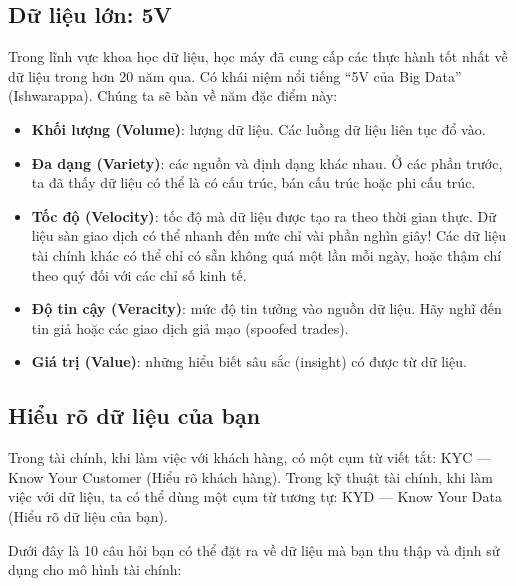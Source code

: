 \subsection{Dữ liệu lớn: 5V}

Trong lĩnh vực khoa học dữ liệu, học máy đã cung cấp các thực hành tốt nhất về dữ liệu trong hơn 20 năm qua. Có khái niệm nổi tiếng ``5V của Big Data'' (Ishwarappa). Chúng ta sẽ bàn về năm đặc điểm này:

\begin{itemize}
  \item \textbf{Khối lượng (Volume)}: lượng dữ liệu. Các luồng dữ liệu liên tục đổ vào.
  \item \textbf{Đa dạng (Variety)}: các nguồn và định dạng khác nhau. Ở các phần trước, ta đã thấy dữ liệu có thể là có cấu trúc, bán cấu trúc hoặc phi cấu trúc.
  \item \textbf{Tốc độ (Velocity)}: tốc độ mà dữ liệu được tạo ra theo thời gian thực. Dữ liệu sàn giao dịch có thể nhanh đến mức chỉ vài phần nghìn giây! Các dữ liệu tài chính khác có thể chỉ có sẵn không quá một lần mỗi ngày, hoặc thậm chí theo quý đối với các chỉ số kinh tế.
  \item \textbf{Độ tin cậy (Veracity)}: mức độ tin tưởng vào nguồn dữ liệu. Hãy nghĩ đến tin giả hoặc các giao dịch giả mạo (spoofed trades).
  \item \textbf{Giá trị (Value)}: những hiểu biết sâu sắc (insight) có được từ dữ liệu.
\end{itemize}

\subsection{Hiểu rõ dữ liệu của bạn}

Trong tài chính, khi làm việc với khách hàng, có một cụm từ viết tắt: KYC — Know Your Customer (Hiểu rõ khách hàng). Trong kỹ thuật tài chính, khi làm việc với dữ liệu, ta có thể dùng một cụm từ tương tự: KYD — Know Your Data (Hiểu rõ dữ liệu của bạn).

Dưới đây là 10 câu hỏi bạn có thể đặt ra về dữ liệu mà bạn thu thập và định sử dụng cho mô hình tài chính:

